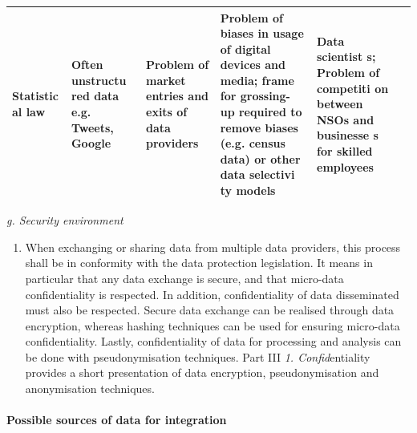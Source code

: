 \documentclass[
]{article}
\providecommand{\tightlist}{%
  \setlength{\itemsep}{0pt}\setlength{\parskip}{0pt}}
\begin{document}
\begin{longtable}[]{@{}llllll@{}}
\begin{minipage}[t]{0.14\columnwidth}
Statistic
al
law\strut
\end{minipage} & \begin{minipage}[t]{0.14\columnwidth}\raggedright
Often
unstructu
red
data e.g.
Tweets,
Google\strut
\end{minipage} & \begin{minipage}[t]{0.14\columnwidth}\raggedright
Problem
of market
entries
and exits
of data
providers\strut
\end{minipage} & \begin{minipage}[t]{0.14\columnwidth}\raggedright
Problem
of biases
in usage
of
digital
devices
and
media;
frame for
grossing-
up
required
to remove
biases
(e.g.
census
data) or
other
data
selectivi
ty
models\strut
\end{minipage} & \begin{minipage}[t]{0.14\columnwidth}\raggedright
Data
scientist
s;
Problem
of
competiti
on
between
NSOs and
businesse
s
for
skilled
employees\strut
\end{minipage}\tabularnewline
\bottomrule
\end{longtable}

\emph{g. Security environment}

\begin{enumerate}
\def\labelenumi{\arabic{enumi}.}
\setcounter{enumi}{212}
\tightlist
\item
  When exchanging or sharing data from multiple data providers, this
  process shall be in conformity with the data protection legislation.
  It means in particular that any data exchange is secure, and that
  micro-data confidentiality is respected. In addition,
  confidentiality of data disseminated must also be respected. Secure
  data exchange can be realised through data encryption, whereas
  hashing techniques can be used for ensuring micro-data
  confidentiality. Lastly, confidentiality of data for processing and
  analysis can be done with pseudonymisation techniques. Part III \emph{1.
  Confid}entiality provides a short presentation of data encryption,
  pseudonymisation and anonymisation techniques.
\end{enumerate}

\hypertarget{d.3.-possible-sources-of-data-for-integration}{%
\paragraph{Possible sources of data for integration}\label{d.3.-possible-sources-of-data-for-integration}}
\end{document}
